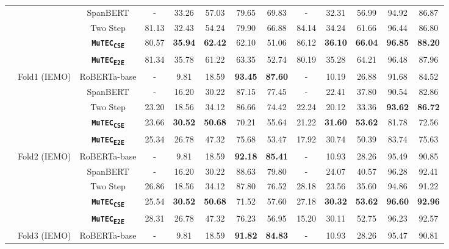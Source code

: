 \documentclass{article}
\newcommand{\subone}{\textbf{\texttt{MuTEC\textsubscript{CSE}}}}
\newcommand{\overall}{\textbf{\texttt{MuTEC\textsubscript{E2E}}}}
\begin{document}
\begin{table*}[t]
{\begin{tabular}{|c|c|c|c|c|c|c|c|c|c|c|c|c|}
& & SpanBERT & 
- & 33.26 & 57.03 & 79.65 & 69.83 & - & 32.31 & 56.99 & 94.92 & 86.87 \\ \cline{3-13} 
&  & Two Step  &      
81.13 & 32.43  & 54.24  & 79.90 & 66.88 & 84.14 & 34.24 & 61.66 & 96.44 & 86.80 \\ 
\cline{3-13} 
&  & \subone  &      
80.57 & \textbf{35.94}  & \textbf{62.42}  & 62.10 & 51.06 & 86.12 & \textbf{36.10} & \textbf{66.04} & \textbf{96.85} & \textbf{88.20}\\ 
\cline{3-13} 
& & \overall &      
81.34 & 35.78 & 61.22 & 63.35 & 52.74 & 80.19 & 35.28 & 64.21 & 96.48 & 87.96 

\\ 
\cline{2-13} 
& \multirow{5}{*}{Fold1 (IEMO)} 
& RoBERTa-base  & 
 - & 9.81 & 18.59 & \textbf{93.45} & \textbf{87.60} & - & 10.19 & 26.88 & 91.68 & 84.52 \\ \cline{3-13} 
&  & SpanBERT   & 
- & 16.20 & 30.22 & 87.15 & 77.45 & - & 22.41 & 37.80 & 90.54 & 82.86 \\ \cline{3-13} 
&   & Two Step  & 
23.20 & 18.56 & 34.12 &  86.66 & 74.42  &  22.24   &  20.12 & 33.36 & \textbf{93.62}  &  \textbf{86.72}  \\ 
\cline{3-13} 
&   & \subone  & 
23.66 & \textbf{30.52} & \textbf{50.68} &  70.21 & 55.64  &  21.22 & \textbf{31.60} & \textbf{53.62} & 81.78  &  72.56  \\ 
\cline{3-13} 
& & \overall &      
25.34 & 26.78 & 47.32 & 75.68 & 53.47 & 17.92 & 30.74 & 50.39 & 83.74 & 75.63 \\
\cline{2-13} 
& \multirow{5}{*}{Fold2 (IEMO)} 
& RoBERTa-base  & 
- & 9.81  & 18.59 & \textbf{92.18} & \textbf{85.41} & - & 10.93 & 28.26 & 95.49 & 90.85 \\ \cline{3-13} 
&  & SpanBERT  & 
- & 16.20 & 30.22 & 88.63 & 79.80 & - & 24.07 & 40.57 & 96.28 & 92.41 \\ \cline{3-13} 
&  & Two Step &
26.86 & 18.56 & 34.12 & 87.80  & 76.52 & 28.18  & 23.56 & 35.60 & 94.86  & 91.22  \\ 
\cline{3-13} 
&  & \subone &
25.54 & \textbf{30.52} & \textbf{50.68} & 71.52  &  57.60 & 27.18  & \textbf{30.32} & \textbf{53.62} & \textbf{96.60}  & \textbf{92.96}  
\\ 
\cline{3-13} 
& & \overall &      
28.31 & 26.78 & 47.32 & 76.23 & 56.95 & 15.20 & 30.11 & 52.75 & 96.23 & 92.57 
\\ 
\cline{2-13} 
& \multirow{5}{*}{Fold3 (IEMO)} 
& RoBERTa-base  & 
- & 9.81  & 18.59 & \textbf{91.82} & \textbf{84.83} & - & 10.93 & 28.26 & 95.47 & 90.81 \\ \cline{3-13} 

\end{tabular}}
\end{table*}
\end{document}
